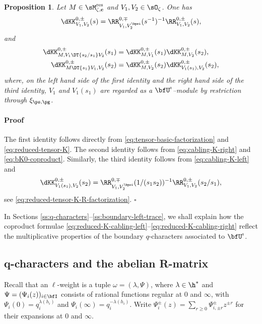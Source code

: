 \documentclass[reqno]{amsart}
\numberwithin{equation}{section}
\newtheorem*{proposition}{Proposition}
\newenvironment{pf}{\medskip\paragraph{{\sc Proof}}}{\hfill$\square$\par\medskip}
\begin{document}
\begin{proposition}\label{prop:reduced-tensor-K-cabling}
Let $M\in\sM_{\zeta,\mathbf c}^{\mathrm{res}}$ and
$V_1,V_2\in\sO_\zeta$.
One has
\begin{equation}\label{eq:reduced-tensor-K-R-factorization}
	{\dKK}^{0,\pm}_{V_1,V_2}(s)
	=
	\RR^{0,\mp}_{V_1,V_2^{\bpsi}}(s^{-1})^{-1}
	\RR^{0,\pm}_{V_1,V_2}(s),
\end{equation}
and
\begin{align}
	\label{eq:reduced-K-cabling-right}
	{\dKK}^{0,\pm}_{M,V_1\DT{s_2/s_1}V_2}(s_1)
	&=
	{\dKK}^{0,\pm}_{M,V_1}(s_1)
	{\dKK}^{0,\pm}_{M,V_2}(s_2),
	\\
	\label{eq:reduced-K-cabling-left}
	{\dKK}^{0,\pm}_{M\DT{s_1}V_1,V_2}(s_2)
	&=
	{\dKK}^{0,\pm}_{M,V_2}(s_2)
	{\dKK}^{0,\pm}_{V_1(s_1),V_2}(s_2),
\end{align}
where, on the left hand side of the first identity and the right hand side of the third identity, $V_1$ and $V_1(s_1)$ are
regarded as a $\bfU^\imath$--module by restriction through
$\xi_{\ps,\pg}$.
\end{proposition}

\begin{pf}
The first identity follows directly from
\eqref{eq:tensor-basic-factorization} and \eqref{eq:reduced-tensor-K}. 	
The second identity follows from \eqref{eq:cabling-K-right} and 
\eqref{eq:bK0-coproduct}.
Similarly, the third identity follows from
\eqref{eq:cabling-K-left} and
\[
{\dKK}^{0,\pm}_{V_1(s_1),V_2}(s_2)
=
\RR^{0,\mp}_{V_1,V_2^\bpsi}(1/(s_1s_2))^{-1}
\RR^{0,\pm}_{V_1,V_2}(s_2/s_1),
\]
see \eqref{eq:reduced-tensor-K-R-factorization}.
\end{pf}

In Sections \ref{ss:q-characters}--\ref{ss:boundary-left-trace}, we shall explain how the coproduct formulae \eqref{eq:reduced-K-cabling-left}--\eqref{eq:reduced-K-cabling-right}
reflect the multiplicative properties of the boundary $q$-characters associated to $\bfU^\imath$.

\subsection{q-characters and the abelian R-matrix \cite{frenkel-reshetikhin-98,hernandez-05}}
\label{ss:fusion}
\label{ss:q-characters}
Recall that an $\ell$-weight is a tuple $\omega=(\lambda,\Psi)$, where
$\lambda\in\h^*$ and $\Psi=(\Psi_i(z))_{i\in\bfI}$ consists of
rational functions regular at $0$ and $\infty$, with
$\Psi_i(0)=q_i^{\lambda(h_i)}$ and
$\Psi_i(\infty)=q_i^{-\lambda(h_i)}$.
Write $\Psi_i^\pm(z)=\sum_{r\geq0}\Psi_{i,\pm r}^\pm z^{\pm r}$
for their expansions at $0$ and $\infty$. 
\end{document}
